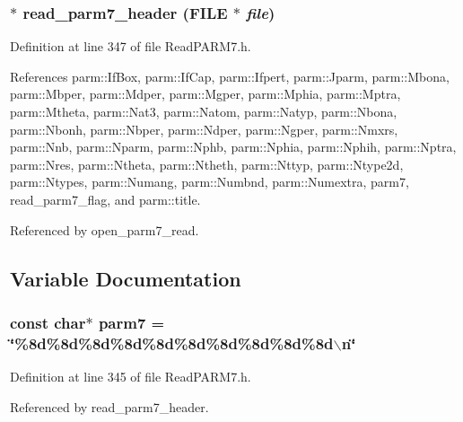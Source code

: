 \subsubsection{$\ast$ read\_\-parm7\_\-header (FILE $\ast$ {\em file})\hspace{0.3cm}{\tt  [static]}}\label{ReadPARM7_8h_a14}




Definition at line 347 of file Read\-PARM7.h.

References parm::If\-Box, parm::If\-Cap, parm::Ifpert, parm::Jparm, parm::Mbona, parm::Mbper, parm::Mdper, parm::Mgper, parm::Mphia, parm::Mptra, parm::Mtheta, parm::Nat3, parm::Natom, parm::Natyp, parm::Nbona, parm::Nbonh, parm::Nbper, parm::Ndper, parm::Ngper, parm::Nmxrs, parm::Nnb, parm::Nparm, parm::Nphb, parm::Nphia, parm::Nphih, parm::Nptra, parm::Nres, parm::Ntheta, parm::Ntheth, parm::Nttyp, parm::Ntype2d, parm::Ntypes, parm::Numang, parm::Numbnd, parm::Numextra, parm7, read\_\-parm7\_\-flag, and parm::title.

Referenced by open\_\-parm7\_\-read.

\subsection{Variable Documentation}
\subsubsection{\setlength{\rightskip}{0pt plus 5cm}const char$\ast$ parm7 = \char`\"{}\%8d\%8d\%8d\%8d\%8d\%8d\%8d\%8d\%8d\%8d$\backslash$n\char`\"{}\hspace{0.3cm}{\tt  [static]}}\label{ReadPARM7_8h_a3}




Definition at line 345 of file Read\-PARM7.h.

Referenced by read\_\-parm7\_\-header.